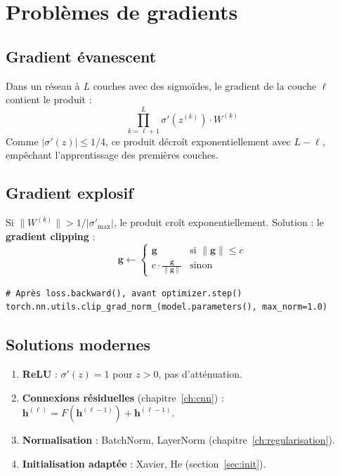 \section{Probl\`emes de gradients}
\label{sec:gradient_problems}

\subsection{Gradient \'evanescent}

Dans un r\'eseau \`a $L$ couches avec des sigmo\"ides, le gradient de la couche $\ell$ contient le produit :
\[
\prod_{k=\ell+1}^{L} \sigma'(z^{(k)}) \cdot W^{(k)}
\]
Comme $|\sigma'(z)| \leq 1/4$, ce produit d\'ecro\^it exponentiellement avec $L - \ell$, emp\^echant l'apprentissage des premi\`eres couches.

\subsection{Gradient explosif}

Si $\|W^{(k)}\| > 1/|\sigma'_{\max}|$, le produit cro\^it exponentiellement. Solution : le \textbf{gradient clipping} :
\[
\bm{g} \leftarrow \begin{cases}
\bm{g} & \text{si } \|\bm{g}\| \leq c \\
c \cdot \frac{\bm{g}}{\|\bm{g}\|} & \text{sinon}
\end{cases}
\]

\begin{codeblock}[title=\textbf{Gradient clipping en PyTorch}]
\begin{verbatim}
# Après loss.backward(), avant optimizer.step()
torch.nn.utils.clip_grad_norm_(model.parameters(), max_norm=1.0)
\end{verbatim}
\end{codeblock}

\subsection{Solutions modernes}

\begin{enumerate}
\item \textbf{ReLU} : $\sigma'(z) = 1$ pour $z > 0$, pas d'att\'enuation.
\item \textbf{Connexions r\'esiduelles} (chapitre~\ref{ch:cnn}) : $\bm{h}^{(\ell)} = F(\bm{h}^{(\ell-1)}) + \bm{h}^{(\ell-1)}$.
\item \textbf{Normalisation} : BatchNorm, LayerNorm (chapitre~\ref{ch:regularisation}).
\item \textbf{Initialisation adapt\'ee} : Xavier, He (section~\ref{sec:init}).
\end{enumerate}

